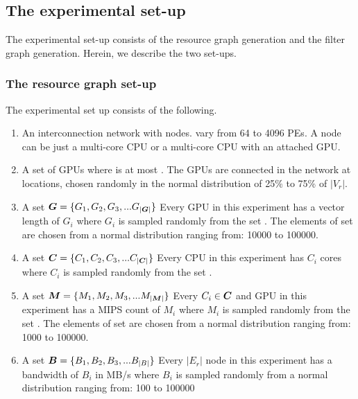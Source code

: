 \subsection{The experimental set-up}
\label{sec:experimental-setup}

The experimental set-up consists of the resource graph generation and the
filter graph generation. Herein, we describe the two set-ups.

\subsubsection{The resource graph set-up}
\label{sec:resource-graph-setup}

The experimental set up consists of the following.

\begin{enumerate}

\item An interconnection network with \numtplgynodes
  nodes. \numtplgynodes vary from 64 to 4096 PEs. A node can be just a
  multi-core CPU or a multi-core CPU with an attached GPU.

\item A set of \gpunum GPUs where \gpunum is at most \numtplgynodes. The
  GPUs are connected in the network at locations, chosen randomly in the
  normal distribution of 25\% to 75\% of $|V_r|$.

\item A set $\bm{G} = \{G_1, G_2, G_3, ... G_{|\bm{G}|}\}$
  Every GPU in this experiment has a vector
  length of $G_i$ where $G_i$ is sampled randomly from the set
  \veclenset. The elements of set \veclenset are chosen from a normal
  distribution ranging from: 10000 to 100000.

\item A set $\bm{C} = \{C_1, C_2, C_3, ... C_{|\bm{C}|}\}$
  Every CPU in this experiment has $C_i$
  cores where $C_i$ is sampled randomly from the set \corenumset.

\item A set $\bm{M} = \{M_1, M_2, M_3, ... M_{|\bm{M}|}\}$
   Every $C_i \in \bm{C}$ and GPU in this
  experiment has a MIPS count of $M_i$ where $M_i$ is sampled randomly
  from the set \mipsset. The elements of set \mipsset are chosen from a
  normal distribution ranging from: 1000 to 100000.

\item A set $\bm{B} = \{B_1, B_2, B_3, ... B_{|B|}\}$
  Every $|E_r|$ node in this experiment has a bandwidth of $B_i$ in MB/s where $B_i$
  is sampled randomly from a normal distribution ranging from: 100 to 100000

\end{enumerate}

